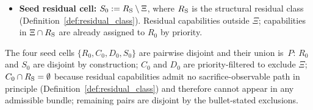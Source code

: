 \begin{definition}
\begin{itemize}
  zero want-pursuit sacrifice evidence (dormant \emph{wants}).
\item \textbf{Seed residual cell:} $S_0 := R_{\mathrm{S}} \setminus \Xi$,
  where $R_{\mathrm{S}}$ is the structural residual class
  (Definition~\ref{def:residual_class}).  Residual capabilities
  outside $\Xi$; capabilities in $\Xi \cap R_{\mathrm{S}}$ are already
  assigned to $R_0$ by priority.
\end{itemize}
The four seed cells $\{R_0, C_0, D_0, S_0\}$ are pairwise
disjoint and their union is~$P$: $R_0$ and $S_0$ are disjoint by
construction; $C_0$ and $D_0$ are priority-filtered to exclude
$\Xi$; $C_0 \cap R_{\mathrm{S}} = \emptyset$ because residual
capabilities admit no sacrifice-observable path in principle
(Definition~\ref{def:residual_class}) and therefore cannot
appear in any admissible bundle; remaining pairs are disjoint
by the bullet-stated exclusions.


\end{definition}
